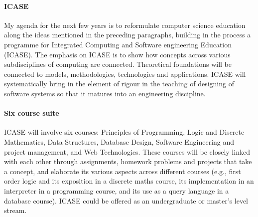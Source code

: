 \documentclass[
9pt, 
]{article}
\begin{document}

\paragraph{ICASE}
My agenda for the next few years is to reformulate computer
science education along the ideas mentioned in the preceding
paragraphs, building in the process a programme for
Integrated Computing and Software engineering Education
(ICASE).  The emphasis on ICASE is to show how concepts
across various subdisciplines of computing are connected.
Theoretical foundations will be connected to models,
methodologies, technologies and applications.  ICASE will
systematically bring in the element of rigour in the
teaching of designing of software systems so that it matures
into an engineering discipline.

\paragraph{Six course suite}
ICASE will involve six courses: Principles of Programming,
Logic and Discrete Mathematics, Data Structures, Database
Design, Software Engineering and project management, and Web
Technologies.  These courses will be closely linked with
each other through assignments, homework problems and
projects that take a concept, and elaborate its various
aspects across different courses (e.g., first order logic
and its exposition in a discrete maths course, its
implementation in an interpreter in a programming course,
and its use as a query language in a database course).
ICASE could be offered as an undergraduate or master's level
stream.
\end{document}
